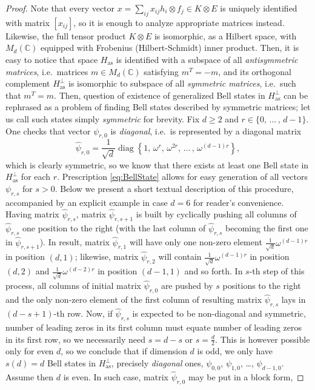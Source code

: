 \documentclass[10pt,a4paper]{amsart}
\newcommand\diag{\operatorname{diag}}
\newcommand{\aspace}{H_{\mathrm{as}}}
\newcommand{\complexes}{\mathbb{C}}
\begin{document}
\begin{proof}
Note that every vector $x = \sum_{ij} x_{ij} h_i \otimes f_j \in K\otimes E$ is uniquely identified with matrix $[x_{ij}]$, so it is enough to analyze appropriate matrices instead. Likewise, the full tensor product $K\otimes E$ is isomorphic, as a Hilbert space, with $M_{d}(\complexes)$ equipped with Frobenius (Hilbert-Schmidt) inner product. Then, it is easy to notice that space $\aspace$ is identified with a subspace of all \emph{antisymmetric matrices}, i.e.~matrices $m \in M_{d}(\complexes)$ satisfying $m^T = -m$, and its orthogonal complement $\aspace^{\perp}$ is isomorphic to subspace of all \emph{symmetric matrices}, i.e.~such that $m^T = m$. Then, question of existence of generalized Bell states in $\aspace^{\perp}$ can be rephrased as a problem of finding Bell states described by symmetric matrices; let us call such states simply \emph{symmetric} for brevity. Fix $d \geqslant 2$ and $r \in \{0,\,  \ldots \, , \, d-1\}$. One checks that vector $\psi_{r,0}$ is \emph{diagonal}, i.e.~is  represented by a diagonal matrix
\begin{equation}
    \hat{\psi}_{r,0} = \frac{1}{\sqrt{d}}\diag\left\{1,\, \omega^{r}, \, \omega^{2r}, \, \ldots \, , \, \omega^{(d-1)r}\right\},
\end{equation}
which is clearly symmetric, so we know that there exists at least one Bell state in $H_{\mathrm{as}}^{\perp}$ for each $r$. Prescription \eqref{eq:BellState} allows for easy generation of all vectors $\psi_{r,s}$ for $s > 0$. Below we present a short textual description of this procedure, accompanied by an explicit example in case $d=6$ for reader's convenience. Having matrix $\hat{\psi}_{r,s}$, matrix $\hat{\psi}_{r,s+1}$ is built by cyclically pushing all columns of $\hat{\psi}_{r,s}$ one position to the right (with the last column of $\hat{\psi}_{r,s}$ becoming the first one in $\hat{\psi}_{r,s+1}$). In result, matrix $\hat{\psi}_{r,1}$ will have only one non-zero element $\frac{1}{\sqrt{d}}\omega^{(d-1)r}$ in  position $(d,1)$; likewise, matrix $\hat{\psi}_{r,2}$ will contain $\frac{1}{\sqrt{d}}\omega^{(d-1)r}$ in position $(d,2)$ and $\frac{1}{\sqrt{d}}\omega^{(d-2)r}$ in position $(d-1,1)$ and so forth. In $s$-th step of this process, all columns of initial matrix $\hat{\psi}_{r,0}$ are pushed by $s$ positions to the right and the only non-zero element of the first column of resulting matrix $\hat{\psi}_{r,s}$ lays in $(d-s+1)$-th row. Now, if $\hat{\psi}_{r,s}$ is expected to be non-diagonal and symmetric, number of leading zeros in its first column must equate number of leading zeros in its first row, so we necessarily need $s = d-s$ or $s = \frac{d}{2}$. This is however possible only for even $d$, so we conclude that if dimension $d$ is odd, we only have $s(d) = d$ Bell states in $\aspace^\perp$, precisely \emph{diagonal} ones, $\psi_{0,0}$, $\psi_{1,0}$, \ldots , $\psi_{d-1,0}$. Assume then $d$ is even. In such case, matrix $\hat{\psi}_{r,0}$ may be put in a block form,

\end{proof}
\end{document}
